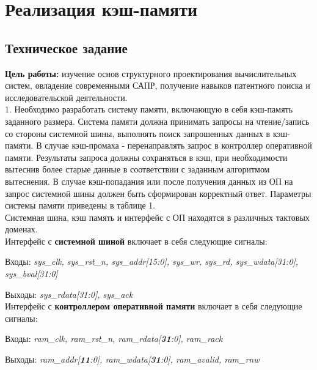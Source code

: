 \documentclass[13pt]{article}
\begin{document}
	\section{Реализация кэш-памяти}
	\subsection{Техническое задание}
	\textbf{Цель работы:} изучение основ структурного проектирования вычислительных систем, овладение современными САПР, получение навыков патентного поиска и исследовательской деятельности.\\
	
	1. Необходимо разработать систему памяти, включающую в себя кэш-память заданного размера. Система памяти должна принимать запросы на чтение/запись со стороны системной шины, выполнять поиск запрошенных данных в кэш-памяти. В случае кэш-промаха - перенаправлять запрос в контроллер оперативной памяти. Результаты запроса должны сохраняться в кэш, при необходимости вытеснив более старые данные в соответствии с заданным алгоритмом вытеснения. В случае кэш-попадания или после получения данных из ОП на запрос системной шины должен быть сформирован корректный ответ. Параметры системы памяти приведены в таблице 1.\\
	Системная шина, кэш память и интерфейс с ОП находятся в различных тактовых доменах.\\
	Интерфейс с \textbf{системной шиной} включает в себя следующие сигналы:
	
	\hspace{5mm}Входы: \textit{sys\_clk, sys\_rst\_n, sys\_addr[15:0], sys\_wr, sys\_rd, sys\_wdata[31:0], sys\_bval[31:0]}
	
	\hspace{5mm}Выходы: \textit{sys\_rdata[31:0], sys\_ack}\\
	Интерфейс с \textbf{контроллером оперативной памяти} включает в себя следующие сигналы:
	
	\hspace{5mm}Входы: \textit{ram\_clk, ram\_rst\_n, ram\_rdata[\textbf{31}:0], ram\_rack}
	
	\hspace{5mm}Выходы: \textit{ram\_addr[\textbf{11}:0], ram\_wdata[\textbf{31}:0], ram\_avalid, ram\_rnw}\\
	
\end{document}

